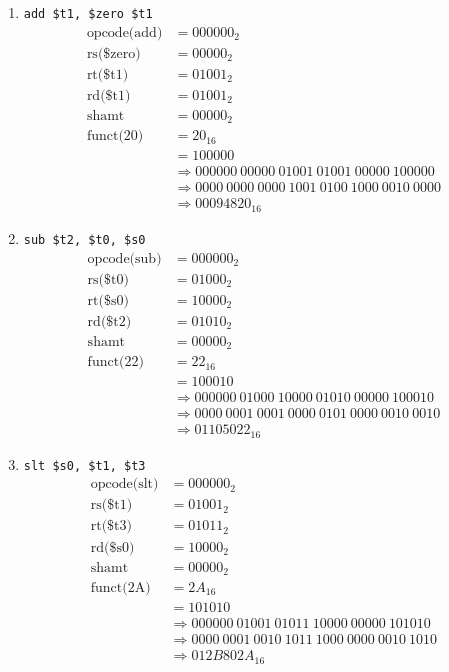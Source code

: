 \documentclass[12pt]{article}
\begin{document}
\begin{enumerate}
\begin{enumerate}
      \item \texttt{add \$t1, \$zero \$t1}
      \begin{align*}
        \text{opcode(add)} &= 000000_2 \\
        \text{rs(\$zero)} &= 00000_2 \\
        \text{rt(\$t1)} &= 01001_2 \\
        \text{rd(\$t1)} &= 01001_2 \\
        \text{shamt} &= 00000_2 \\
        \text{funct(20)} &= 20_{16} \\
        &= 100000\\
        &\Rightarrow 000000 \ 00000 \ 01001 \ 01001 \ 00000 \ 100000\\
        &\Rightarrow 0000 \ 0000 \ 0000 \ 1001 \ 0100 \ 1000 \ 0010 \ 0000\\
        &\Rightarrow 00094820_{16}
      \end{align*}

      \item \texttt{sub \$t2, \$t0, \$s0}
      \begin{align*}
        \text{opcode(sub)} &= 000000_2 \\
        \text{rs(\$t0)} &= 01000_2 \\
        \text{rt(\$s0)} &= 10000_2 \\
        \text{rd(\$t2)} &= 01010_2 \\
        \text{shamt} &= 00000_2 \\
        \text{funct(22)} &= 22_{16} \\
        &= 100010\\
        &\Rightarrow 000000 \ 01000 \ 10000 \ 01010 \ 00000 \ 100010\\
        &\Rightarrow 0000 \ 0001 \ 0001 \ 0000 \ 0101 \ 0000 \ 0010 \ 0010\\
        &\Rightarrow 01105022_{16}
      \end{align*}

      \item \texttt{slt \$s0, \$t1, \$t3}
      \begin{align*}
        \text{opcode(slt)} &= 000000_2 \\
        \text{rs(\$t1)} &= 01001_2 \\
        \text{rt(\$t3)} &= 01011_2 \\
        \text{rd(\$s0)} &= 10000_2 \\
        \text{shamt} &= 00000_2 \\
        \text{funct(2A)} &= 2A_{16} \\
        &= 101010\\
        &\Rightarrow 000000 \ 01001 \ 01011 \ 10000 \ 00000 \ 101010\\
        &\Rightarrow 0000 \ 0001 \ 0010 \ 1011 \ 1000 \ 0000 \ 0010 \ 1010\\
        &\Rightarrow 012B802A_{16}
      \end{align*}


\end{enumerate}
\end{enumerate}
\end{document}
